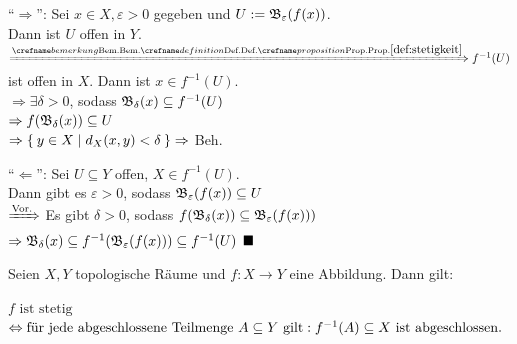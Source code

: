 \begin{beweis}
    \enquote{$\Rightarrow$}: Sei $x \in X, \varepsilon > 0$ gegeben
    und $U := \mathfrak{B}_\varepsilon(f(x))$.\\
    Dann ist $U$ offen in $Y$.\\
    $\xRightarrow{\crefabbr{def:stetigkeit}} f^{-1}(U)$  ist 
    offen in $X$. Dann ist $x \in f^{-1}(U)$.\\
    $\Rightarrow \exists \delta > 0$, sodass 
    $\mathfrak{B}_\delta(x) \subseteq f^{-1} (U)$\\
    $\Rightarrow f(\mathfrak{B}_\delta(x)) \subseteq U$\\
    $\Rightarrow \Set{y \in X | d_X(x,y) < \delta} \Rightarrow$ Beh.

    \enquote{$\Leftarrow$}: Sei $U \subseteq Y$ offen, $X \in f^{-1}(U)$.\\
    Dann gibt es $\varepsilon > 0$, sodass $\mathfrak{B}_\varepsilon(f(x)) \subseteq U$\\
    $\xRightarrow{\text{Vor.}}$ Es gibt $\delta > 0$, sodass
    $f(\mathfrak{B}_\delta(x)) \subseteq \mathfrak{B}_\varepsilon (f(x)))$\\
    $\Rightarrow \mathfrak{B}_\delta(x) \subseteq f^{-1}(\mathfrak{B}_\varepsilon(f(x))) \subseteq f^{-1}(U)$
    $\qed$
\end{beweis}

\begin{bemerkung}
    Seien $X, Y$ topologische Räume und $f:X \rightarrow Y$ eine
    Abbildung. Dann gilt:

    $f \text{ ist stetig}$\\
    $\Leftrightarrow \text{für jede abgeschlossene Teilmenge } A \subseteq Y \text{ gilt}: f^{-1}(A) \subseteq X \text{ ist abgeschlossen.}$
\end{bemerkung}

